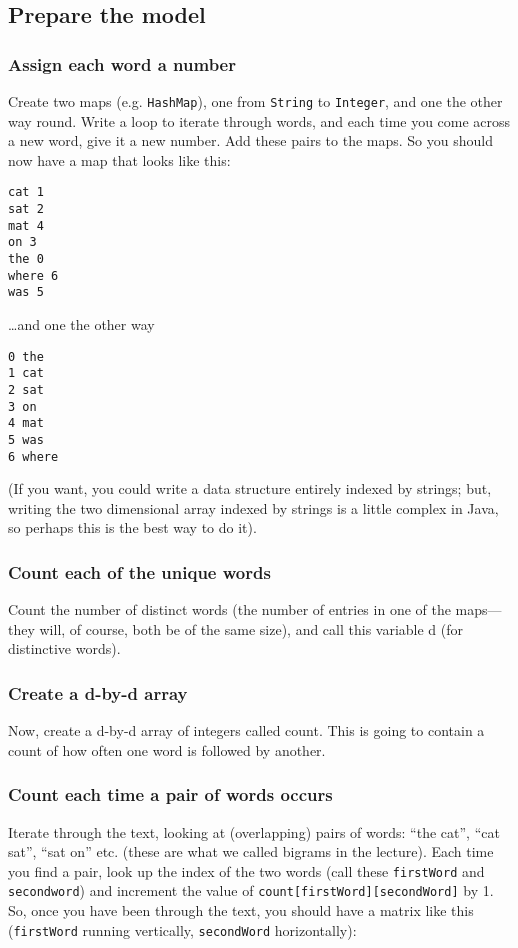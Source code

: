 \documentclass[11pt]{article}
\begin{document}
\subsection{Prepare the model}
\label{sec:org6f77855}
\subsubsection{Assign each word a number}
\label{sec:orgdfa7c15}
Create two maps (e.g. \texttt{HashMap}), one from \texttt{String} to \texttt{Integer}, and one the other way round.
Write a loop to iterate through words, and each time you come across a new word, give it a new number.
Add these pairs to the maps. So you should now have a map that looks like this:

\begin{verbatim}
cat 1
sat 2
mat 4
on 3
the 0
where 6
was 5
\end{verbatim}

…and one the other way

\begin{verbatim}
0 the
1 cat
2 sat
3 on
4 mat
5 was
6 where
\end{verbatim}

(If you want, you could write a data structure entirely indexed by strings; but,
writing the two dimensional array indexed by strings is a little complex in
Java, so perhaps this is the best way to do it). 

\subsubsection{Count each of the unique words}
\label{sec:orgcbd096e}
Count the number of distinct words (the number of entries in one of the
maps—they will, of course, both be of the same size), and call this variable d
(for distinctive words). 

\subsubsection{Create a d-by-d array}
\label{sec:orgbbf6c03}
Now, create a d-by-d array of integers called count. 
This is going to contain a count of how often one word is followed by another.

\subsubsection{Count each time a pair of words occurs}
\label{sec:org6a75b39}
Iterate through the text, looking at (overlapping) pairs of words: “the cat”,
“cat sat”, “sat on” etc.
(these are what we called bigrams in the lecture). 
Each time you find a pair, look up the index of the two words (call these
\texttt{firstWord} and \texttt{secondword}) and increment the value of
\texttt{count[firstWord][secondWord]} by 1. 
So, once you have been through the text, you should have a matrix like this (\texttt{firstWord} running vertically, \texttt{secondWord} horizontally): 
\end{document}
